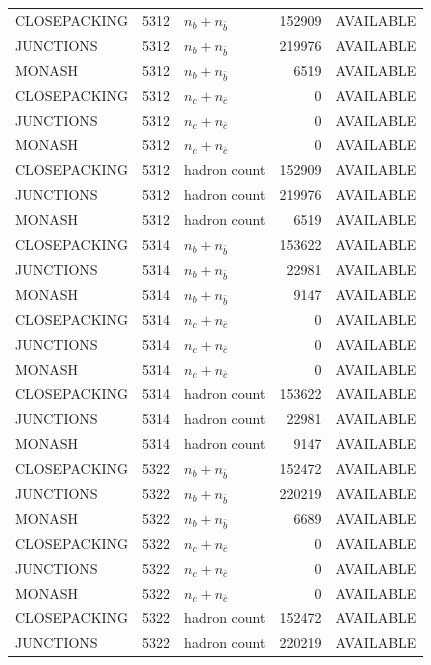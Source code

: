 \begin{landscape}
\begin{longtable}{@{}lrlrl@{}}
CLOSEPACKING & 5312 & $n_b+n_{\bar b}$ & \num{152909} & AVAILABLE \\
JUNCTIONS & 5312 & $n_b+n_{\bar b}$ & \num{219976} & AVAILABLE \\
MONASH & 5312 & $n_b+n_{\bar b}$ & \num{6519} & AVAILABLE \\
CLOSEPACKING & 5312 & $n_c+n_{\bar c}$ & \num{0} & AVAILABLE \\
JUNCTIONS & 5312 & $n_c+n_{\bar c}$ & \num{0} & AVAILABLE \\
MONASH & 5312 & $n_c+n_{\bar c}$ & \num{0} & AVAILABLE \\
CLOSEPACKING & 5312 & hadron count & \num{152909} & AVAILABLE \\
JUNCTIONS & 5312 & hadron count & \num{219976} & AVAILABLE \\
MONASH & 5312 & hadron count & \num{6519} & AVAILABLE \\
CLOSEPACKING & 5314 & $n_b+n_{\bar b}$ & \num{153622} & AVAILABLE \\
JUNCTIONS & 5314 & $n_b+n_{\bar b}$ & \num{22981} & AVAILABLE \\
MONASH & 5314 & $n_b+n_{\bar b}$ & \num{9147} & AVAILABLE \\
CLOSEPACKING & 5314 & $n_c+n_{\bar c}$ & \num{0} & AVAILABLE \\
JUNCTIONS & 5314 & $n_c+n_{\bar c}$ & \num{0} & AVAILABLE \\
MONASH & 5314 & $n_c+n_{\bar c}$ & \num{0} & AVAILABLE \\
CLOSEPACKING & 5314 & hadron count & \num{153622} & AVAILABLE \\
JUNCTIONS & 5314 & hadron count & \num{22981} & AVAILABLE \\
MONASH & 5314 & hadron count & \num{9147} & AVAILABLE \\
CLOSEPACKING & 5322 & $n_b+n_{\bar b}$ & \num{152472} & AVAILABLE \\
JUNCTIONS & 5322 & $n_b+n_{\bar b}$ & \num{220219} & AVAILABLE \\
MONASH & 5322 & $n_b+n_{\bar b}$ & \num{6689} & AVAILABLE \\
CLOSEPACKING & 5322 & $n_c+n_{\bar c}$ & \num{0} & AVAILABLE \\
JUNCTIONS & 5322 & $n_c+n_{\bar c}$ & \num{0} & AVAILABLE \\
MONASH & 5322 & $n_c+n_{\bar c}$ & \num{0} & AVAILABLE \\
CLOSEPACKING & 5322 & hadron count & \num{152472} & AVAILABLE \\
JUNCTIONS & 5322 & hadron count & \num{220219} & AVAILABLE \\

\end{longtable}
\end{landscape}
